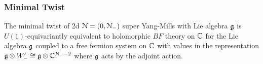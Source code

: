 \documentclass[10pt, oneside]{article}
\begin{document}

\subsubsection{Minimal Twist} \label{sect:2d0Nminimaltwist}

\begin{theorem} \label{4d_2_minimal_twist_thm}
The minimal twist of 2d $\mathcal N=(0,\mathcal N_-)$ super Yang-Mills with Lie algebra $\mathfrak g$ is $U(1)$-equivariantly equivalent to holomorphic $BF$ theory on $\mathbb C$ for the Lie algebra $\mathfrak g$ coupled to a free fermion system on $\mathbb C$ with values in the representation $\mathfrak g \otimes W_-' \cong \mathfrak g \otimes \mathbb C^{\mathcal N_- - 2}$ where $\mathfrak g$ acts by the adjoint action. 
\end{theorem}
\end{document}
